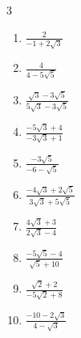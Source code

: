 \begin{multicols}{3}
\begin{enumerate}

  \item $\displaystyle \frac{2}{-1+2\sqrt{3}}$


\columnbreak %

  \item $\displaystyle \frac{4}{4-5\sqrt{5}}$


  \item $\displaystyle \frac{\sqrt{3}-3\sqrt{5}}{5\sqrt{3}-3\sqrt{5}}$


  \item $\displaystyle \frac{-5\sqrt{3}+4}{-3\sqrt{3}+1}$


  \item $\displaystyle \frac{-3\sqrt{5}}{-6-\sqrt{5}}$


  \item $\displaystyle \frac{-4\sqrt{3}+2\sqrt{5}}{3\sqrt{3}+5\sqrt{5}}$


\columnbreak %

\resetques

  \item $\displaystyle \frac{4\sqrt{3}+3}{2\sqrt{3}-4}$


  \item $\displaystyle \frac{-5\sqrt{5}-4}{\sqrt{5}+10}$


  \item $\displaystyle \frac{\sqrt{2}+2}{-5\sqrt{2}+8}$


  \item $\displaystyle \frac{-10-2\sqrt{3}}{4-\sqrt{3}}$



\end{enumerate}
\end{multicols}
